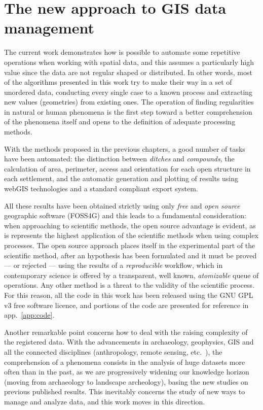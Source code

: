     \section{The new approach to GIS data management}
        The current work demonstrates how is possible to automate some repetitive operations when working with spatial data, and this assumes a particularly high value since the data are not regular shaped or distributed. In other words, most of the algorithms presented in this work try to make their way in a set of unordered data, conducting every single case to a known process and extracting new values (geometries) from existing ones. The operation of finding regularities in natural or human phenomena is the first step toward a better comprehension of the phenomena itself and opens to the definition of adequate processing methods.

        With the methods proposed in the previous chapters, a good number of tasks have been automated: the distinction between \emph{ditches} and \emph{compounds}, the calculation of area, perimeter, access and orientation for each open structure in each settlement, and the automatic generation and plotting of results using webGIS technologies and a standard compliant export system.

        All these results have been obtained strictly using only \emph{free} and \emph{open source} geographic software (FOSS4G) and this leads to a fundamental consideration: when approaching to scientific methods, the open source advantage is evident, as is represents the highest application of the scientific methods when using complex processes. The open source approach places itself in the experimental part of the scientific method, after an hypothesis has been formulated and it must be proved --- or rejected --- using the results of a \emph{reproducible} workflow, which in contemporary science is offered by a transparent, well known, \emph{atomizable} queue of operations. Any other method is a threat to the validity of the scientific process. For this reason, all the code in this work has been released using the GNU GPL v3 free software licence, and portions of the code are presented for reference in app.~\ref{app:code}.

        Another remarkable point concerns how to deal with the raising complexity of the registered data. With the advancements in archaeology, geophysics, GIS and all the connected disciplines (anthropology, remote sensing, etc.\ ), the comprehension of a phenomena consists in the analysis of huge datasets more often than in the past, as we are progressively widening our knowledge horizon (moving from archaeology to landscape archeology), basing the new studies on previous published results. This inevitably concerns the study of new ways to manage and analyze data, and this work moves in this direction.
        
